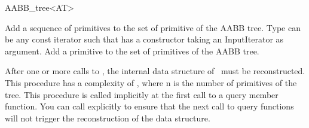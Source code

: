 \begin{ccRefClass}{AABB_tree<AT>}
\ccOperations

\ccGlue
{}

\ccGlue
{}
   {Add a sequence of primitives to the set of primitive of the AABB
   tree. Type  can be any const iterator such that 
   has a constructor taking an InputIterator as argument.}
\ccGlue
{}
   {Add a primitive to the set of primitives of the AABB tree.}
 
\begin{ccAdvanced}
   {After one or more calls to , the internal data structure
   of \ccRefName\ must be reconstructed.  This procedure has a complexity of
   , where n is the number of primitives of the tree.  This
   procedure is called implicitly at the first call to a query member
   function.  You can call  explicitly to ensure that the
   next call to query functions will not trigger the reconstruction of the
   data structure.}
\end{ccAdvanced}


\ccGlue
{}
\ccGlue
{}
\ccGlue
{}



\end{ccRefClass}
